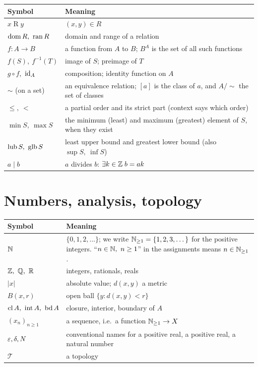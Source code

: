 \begin{longtable}{@{}p{3.6cm}p{11cm}@{}}
	\toprule
	\textbf{Symbol} & \textbf{Meaning}\\
	\midrule
	\endhead
	$x\mathrel{R}y$ & $(x,y)\in R$\\
	$\operatorname{dom} R,\ \operatorname{ran} R$ & domain and range of a relation\\
	$f:A\to B$ & a function from $A$ to $B$; $B^A$ is the set of all such functions\\
	$f(S),\ f^{-1}(T)$ & image of $S$; preimage of $T$\\
	$g\circ f$,\ $\operatorname{id}_A$ & composition; identity function on $A$\\
	$\sim$ (on a set) & an equivalence relation; $[a]$ is the class of $a$, and $A/{\sim}$ the set of classes\\
	$\le,\ <$ & a partial order and its strict part (context says which order)\\
	$\min S,\ \max S$ & the minimum (least) and maximum (greatest) element of $S$, when they exist\\
	$\operatorname{lub} S,\ \operatorname{glb} S$ & least upper bound and greatest lower bound (also $\sup S,\ \inf S$)\\
	$a\mid b$ & $a$ divides $b$: $\exists k\in\mathbb{Z}\; b=ak$\\
	\bottomrule
\end{longtable}

\section*{Numbers, analysis, topology}

\begin{longtable}{@{}p{3.6cm}p{11cm}@{}}
	\toprule
	\textbf{Symbol} & \textbf{Meaning}\\
	\midrule
	\endhead
	$\mathbb{N}$ & $\{0,1,2,\dots\}$; we write $\mathbb{N}_{\ge1}=\{1,2,3,\dots\}$ for the positive integers. ``$n\in\N,\ n\ge1$'' in the assignments means $n\in\mathbb{N}_{\ge1}$.\\
	$\Z,\ \Q,\ \R$ & integers, rationals, reals\\
	$|x|$ & absolute value; $d(x,y)$ a metric\\
	$B(x,r)$ & open ball $\{y: d(x,y)<r\}$\\
	$\operatorname{cl} A,\ \operatorname{int} A,\ \operatorname{bd} A$ & closure, interior, boundary of $A$\\
	$(x_n)_{n\ge1}$ & a sequence, i.e.\ a function $\mathbb{N}_{\ge1}\to X$\\
	$\varepsilon,\delta,N$ & conventional names for a positive real, a positive real, a natural number\\
	$\mathcal T$ & a topology\\
	\bottomrule
\end{longtable}

